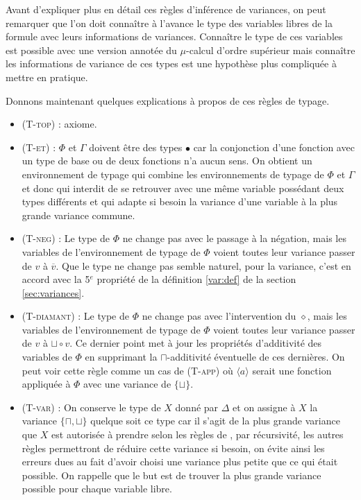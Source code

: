 \documentclass{rapport}
\theoremstyle{plain}
\theoremstyle{remark}
\theoremstyle{definition}
\begin{document}
Avant d'expliquer plus en détail ces règles d'inférence de variances, on peut remarquer que l'on doit connaître à l'avance le type des variables libres de la formule avec leurs informations de variances. Connaître le type de ces variables est possible avec une version annotée du $\mu$-calcul d'ordre supérieur mais connaître les informations de variance de ces types est une hypothèse plus compliquée à mettre en pratique. 

Donnons maintenant quelques explications à propos de ces règles de typage.
\begin{itemize}
	\item (\textsc{T-top}) : axiome.
	\item (\textsc{T-et}) : $\Phi$ et $\Gamma$ doivent être des types $\bullet$ car la conjonction d'une fonction avec un type de base ou de deux fonctions n'a aucun sens. On obtient un environnement de typage qui combine les environnements de typage de $\Phi$ et $\Gamma$ et donc qui interdit de se retrouver avec une même variable possédant deux types différents et qui adapte si besoin la variance d'une variable à la plus grande variance commune.
	\item (\textsc{T-neg}) : Le type de $\Phi$ ne change pas avec le passage à la négation, mais les variables de l'environnement de typage de $\Phi$ voient toutes leur variance passer de $v$ à $\overline{v}$. Que le type ne change pas semble naturel, pour la variance, c'est en accord avec la 5$^e$ propriété de la définition \ref{var:def} de la section \ref{sec:variances}.
	\item (\textsc{T-diamant}) : Le type de $\Phi$ ne change pas avec l'intervention du $\diamond$, mais les variables de l'environnement de typage de $\Phi$ voient toutes leur variance passer de $v$ à $\sqcup \circ v$. Ce dernier point met à jour les propriétés d'additivité des variables de $\Phi$ en supprimant la $\sqcap$-additivité éventuelle de ces dernières. On peut voir cette règle comme un cas de (\textsc{T-app}) où $\langle a \rangle$ serait une fonction appliquée à $\Phi$ avec une variance de $\{\sqcup\}$.
	\item (\textsc{T-var}) : On conserve le type de $X$ donné par $\Delta$ et on assigne à $X$ la variance $\{\sqcap, \sqcup\}$ quelque soit ce type car il s'agit de la plus grande variance que $X$ est autorisée à prendre selon les règles de \citep{lange2014model}, par récursivité, les autres règles permettront de réduire cette variance si besoin, on évite ainsi les erreurs dues au fait d'avoir choisi une variance plus petite que ce qui était possible. On rappelle que le but est de trouver la plus grande variance possible pour chaque variable libre.

\end{itemize}
\end{document}
